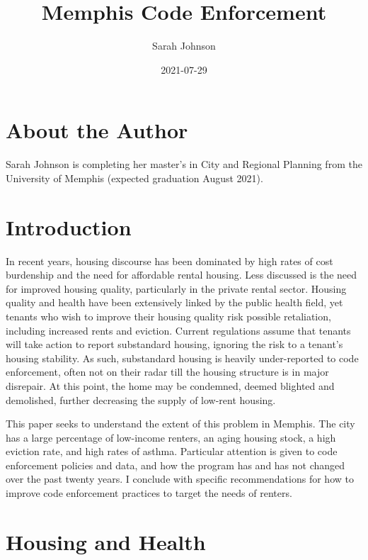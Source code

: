 \documentclass[
]{book}
\title{Memphis Code Enforcement}
\author{Sarah Johnson}
\date{2021-07-29}
\begin{document}
\maketitle

{
\setcounter{tocdepth}{1}
\tableofcontents
}
\hypertarget{about-the-author}{%
\chapter*{About the Author}\label{about-the-author}}

Sarah Johnson is completing her master's in City and Regional Planning from the University of Memphis (expected graduation August 2021).

\hypertarget{intro}{%
\chapter{Introduction}\label{intro}}

In recent years, housing discourse has been dominated by high rates of cost burdenship and the need for affordable rental housing. Less discussed is the need for improved housing quality, particularly in the private rental sector. Housing quality and health have been extensively linked by the public health field, yet tenants who wish to improve their housing quality risk possible retaliation, including increased rents and eviction. Current regulations assume that tenants will take action to report substandard housing, ignoring the risk to a tenant's housing stability. As such, substandard housing is heavily under-reported to code enforcement, often not on their radar till the housing structure is in major disrepair. At this point, the home may be condemned, deemed blighted and demolished, further decreasing the supply of low-rent housing.

This paper seeks to understand the extent of this problem in Memphis. The city has a large percentage of low-income renters, an aging housing stock, a high eviction rate, and high rates of asthma. Particular attention is given to code enforcement policies and data, and how the program has and has not changed over the past twenty years. I conclude with specific recommendations for how to improve code enforcement practices to target the needs of renters.

\hypertarget{housing-and-health}{%
\chapter{Housing and Health}\label{housing-and-health}}
\end{document}
